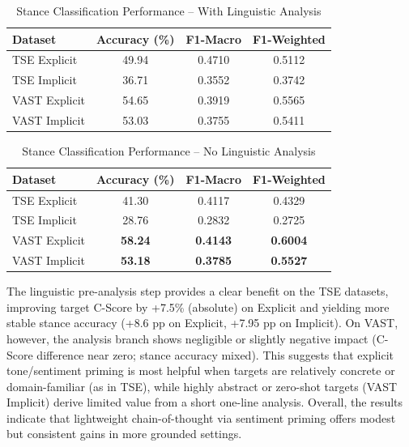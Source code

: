 \documentclass[conference]{IEEEtran}
\begin{document}
\begin{table}[htbp]
\centering
\caption{Stance Classification Performance -- With Linguistic Analysis}
\label{tab:stance_with}
\small
\begin{tabular}{|l|c|c|c|}
\hline
\textbf{Dataset} & \textbf{Accuracy (\%)} & \textbf{F1-Macro} & \textbf{F1-Weighted} \\
\hline
TSE Explicit     & 49.94 & 0.4710 & 0.5112 \\
TSE Implicit     & 36.71 & 0.3552 & 0.3742 \\
VAST Explicit    & 54.65 & 0.3919 & 0.5565 \\
VAST Implicit    & 53.03 & 0.3755 & 0.5411 \\
\hline
\end{tabular}
\end{table}

\begin{table}[htbp]
\centering
\caption{Stance Classification Performance -- No Linguistic Analysis}
\label{tab:stance_no}
\small
\begin{tabular}{|l|c|c|c|}
\hline
\textbf{Dataset} & \textbf{Accuracy (\%)} & \textbf{F1-Macro} & \textbf{F1-Weighted} \\
\hline
TSE Explicit     & 41.30 & 0.4117 & 0.4329 \\
TSE Implicit     & 28.76 & 0.2832 & 0.2725 \\
VAST Explicit    & \textbf{58.24} & \textbf{0.4143} & \textbf{0.6004} \\
VAST Implicit    & \textbf{53.18} & \textbf{0.3785} & \textbf{0.5527} \\
\hline
\end{tabular}
\end{table}

The linguistic pre-analysis step provides a clear benefit on the TSE datasets, improving target C-Score by +7.5\% (absolute) on Explicit and yielding more stable stance accuracy (+8.6 pp on Explicit, +7.95 pp on Implicit). On VAST, however, the analysis branch shows negligible or slightly negative impact (C-Score difference near zero; stance accuracy mixed). This suggests that explicit tone/sentiment priming is most helpful when targets are relatively concrete or domain-familiar (as in TSE), while highly abstract or zero-shot targets (VAST Implicit) derive limited value from a short one-line analysis. Overall, the results indicate that lightweight chain-of-thought via sentiment priming offers modest but consistent gains in more grounded settings.
\end{document}
